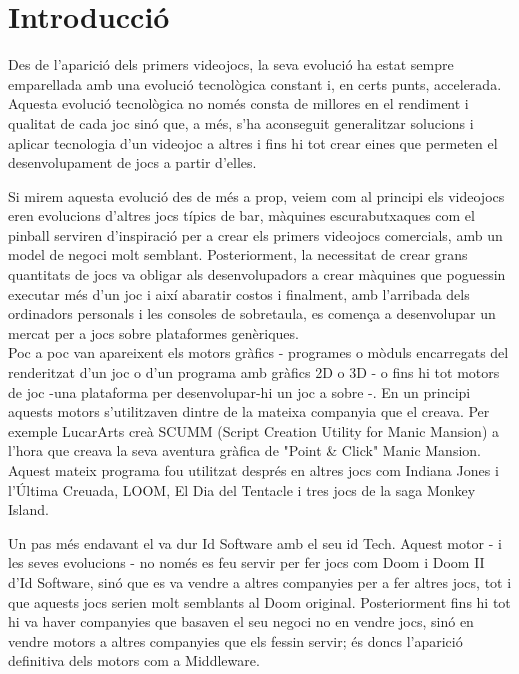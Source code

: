 \chapter{Introducció}

Des de l'aparició dels primers videojocs, la seva evolució ha estat sempre emparellada amb una evolució tecnològica constant i, en certs punts, accelerada. Aquesta evolució tecnològica no només consta de millores en el rendiment i qualitat de cada joc sinó que, a més, s'ha aconseguit generalitzar solucions i aplicar tecnologia d'un videojoc a altres i fins hi tot crear eines que permeten el desenvolupament de jocs a partir d'elles.

Si mirem aquesta evolució des de més a prop, veiem com al principi els videojocs eren evolucions d'altres jocs típics de bar, màquines escurabutxaques com el pinball serviren d'inspiració per a crear els primers videojocs comercials, amb un model de negoci molt semblant. Posteriorment, la necessitat de crear grans quantitats de jocs va obligar als desenvolupadors a crear màquines que poguessin executar més d'un joc i així abaratir costos i finalment, amb l'arribada dels ordinadors personals i les consoles de sobretaula, es comença a desenvolupar un mercat per a jocs sobre plataformes genèriques.
\\

Poc a poc van apareixent els motors gràfics - programes o mòduls encarregats del renderitzat d'un joc o d'un programa amb gràfics 2D o 3D - o fins hi tot motors de joc -una plataforma per desenvolupar-hi un joc a sobre -. En un principi aquests motors s'utilitzaven dintre de la mateixa companyia que el creava. Per exemple LucarArts creà {SCUMM} ({Script Creation Utility for Manic Mansion}) a l'hora que creava la seva aventura gràfica de "Point \& Click" Manic Mansion. Aquest mateix programa fou utilitzat després en altres jocs com Indiana Jones i l'Última Creuada, LOOM, El Dia del Tentacle i tres jocs de la saga Monkey Island.

Un pas més endavant el va dur Id Software amb el seu id Tech. Aquest motor - i les seves evolucions - no només es feu servir per fer jocs com Doom i Doom II d'Id Software, sinó que es va vendre a altres companyies per a fer altres jocs, tot i que aquests jocs serien molt semblants al Doom original. Posteriorment fins hi tot hi va haver companyies que basaven el seu negoci no en vendre jocs, sinó en vendre motors a altres companyies que els fessin servir; és doncs l'aparició definitiva dels motors com a Middleware.
\\

